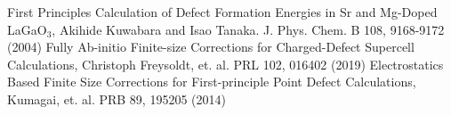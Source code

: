 \documentclass{article}
\begin{document}
\begin{thebibliography}{99}
        First Principles Calculation of Defect Formation Energies in Sr and Mg-Doped LaGaO$_3$, Akihide Kuwabara and Isao Tanaka. J. Phys. Chem. B 108, 9168-9172 (2004)
        Fully Ab-initio Finite-size Corrections for Charged-Defect Supercell Calculations, Christoph Freysoldt, et. al. PRL 102, 016402 (2019)
        Electrostatics Based Finite Size Corrections for First-principle Point Defect Calculations, Kumagai, et. al. PRB 89, 195205 (2014) 
\end{thebibliography}
\end{document}
